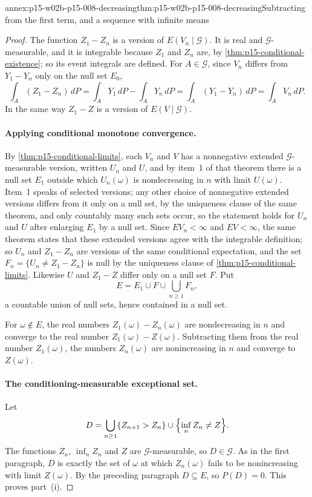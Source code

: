 \begin{annexitem}{annex:p15-w02b-p15-008-decreasing}{thm:p15-w02b-p15-008-decreasing}{Subtracting from the first term, and a sequence with infinite means}
\begin{proof}
The function \(Z_1-Z_n\) is a version of \(E(V_n\mid\mathcal G)\). It is
real and \(\mathcal G\)-measurable, and it is integrable because \(Z_1\)
and \(Z_n\) are, by \cref{thm:p15-conditional-existence}; so its event
integrals are defined. For \(A\in\mathcal G\), since \(V_n\) differs from
\(Y_1-Y_n\) only on the null set \(E_0\),
\[
 \int_A(Z_1-Z_n)\,dP=\int_AY_1\,dP-\int_AY_n\,dP
                    =\int_A(Y_1-Y_n)\,dP=\int_AV_n\,dP .
\]
In the same way \(Z_1-Z\) is a version of \(E(V\mid\mathcal G)\).

\paragraph{Applying conditional monotone convergence.}
By \cref{thm:p15-conditional-limits}, each \(V_n\) and \(V\) has a
nonnegative extended \(\mathcal G\)-measurable version, written
\(U_n\) and \(U\), and by item~1 of that theorem there is a null set
\(E_1\) outside which \(U_n(\omega)\) is nondecreasing in \(n\) with limit
\(U(\omega)\). Item~1 speaks of selected versions; any other choice of
nonnegative extended versions differs from it only on a null set, by the
uniqueness clause of the same theorem, and only countably many such sets
occur, so the statement holds for \(U_n\) and \(U\) after enlarging
\(E_1\) by a null set. Since \(EV_n<\infty\) and \(EV<\infty\), the same theorem
states that these extended versions agree with the integrable
definition; so \(U_n\) and \(Z_1-Z_n\) are versions of the same
conditional expectation, and the set
\(F_n=\{U_n\neq Z_1-Z_n\}\) is null by the uniqueness clause of
\cref{thm:p15-conditional-limits}. Likewise \(U\) and \(Z_1-Z\) differ
only on a null set \(F\). Put
\[
 E=E_1\cup F\cup\bigcup_{n\geq1}F_n ,
\]
a countable union of null sets, hence contained in a null set.

For \(\omega\notin E\), the real numbers \(Z_1(\omega)-Z_n(\omega)\) are
nondecreasing in \(n\) and converge to the real number
\(Z_1(\omega)-Z(\omega)\). Subtracting them from the real number
\(Z_1(\omega)\), the numbers \(Z_n(\omega)\) are nonincreasing in \(n\)
and converge to \(Z(\omega)\).

\paragraph{The conditioning-measurable exceptional set.}
Let
\[
 D=\bigcup_{n\geq1}\{Z_{n+1}>Z_n\}\cup\Bigl\{\inf_nZ_n\neq Z\Bigr\}.
\]
The functions \(Z_n\), \(\inf_nZ_n\) and \(Z\) are
\(\mathcal G\)-measurable, so \(D\in\mathcal G\). As in the first
paragraph, \(D\) is exactly the set of \(\omega\) at which \(Z_n(\omega)\)
fails to be nonincreasing with limit \(Z(\omega)\). By the preceding
paragraph \(D\subseteq E\), so \(P(D)=0\). This proves part~(i).


\end{proof}
\end{annexitem}
